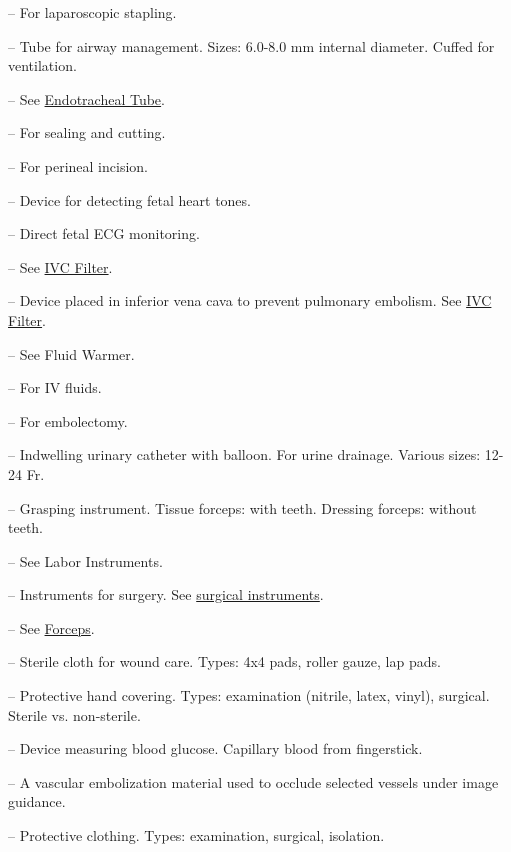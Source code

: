 -- For laparoscopic stapling.

-- Tube for airway management. Sizes: 6.0-8.0 mm internal diameter. Cuffed for ventilation.

-- See \hyperlink{Endotracheal Tube}{Endotracheal Tube}.

-- For sealing and cutting.

-- For perineal incision.

-- Device for detecting fetal heart tones.

-- Direct fetal ECG monitoring.

-- See \hyperlink{IVC Filter}{IVC Filter}.

-- Device placed in inferior vena cava to prevent pulmonary embolism. See \hyperlink{IVC Filter}{IVC Filter}.

-- See Fluid Warmer.

-- For IV fluids.

-- For embolectomy.

-- Indwelling urinary catheter with balloon. For urine drainage. Various sizes: 12-24 Fr.

-- Grasping instrument. Tissue forceps: with teeth. Dressing forceps: without teeth.


-- See Labor Instruments.

-- Instruments for surgery. See \hyperlink{Surgical Instruments}{surgical instruments}.

-- See \hyperlink{Forceps}{Forceps}.

-- Sterile cloth for wound care. Types: 4x4 pads, roller gauze, lap pads.

-- Protective hand covering. Types: examination (nitrile, latex, vinyl), surgical. Sterile vs. non-sterile.

-- Device measuring blood glucose. Capillary blood from fingerstick.

-- A vascular embolization material used to occlude selected vessels under image guidance.

-- Protective clothing. Types: examination, surgical, isolation.

